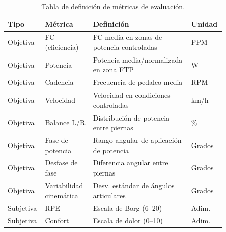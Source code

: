 \begin{table}[htbp]
      \caption{Tabla de definición de métricas de evaluación.}
      \label{tab:metricas_definicion}
      \centering
      \small
      \begin{tabular}{p{0.11\linewidth}p{0.21\linewidth}p{0.43\linewidth}p{0.10\linewidth}}
            \toprule
            \textbf{Tipo} & \textbf{Métrica}        & \textbf{Definición}                       & \textbf{Unidad} \\
            \midrule
            Objetiva      & FC (eficiencia)         & FC media en zonas de potencia controladas & PPM             \\
            Objetiva      & Potencia                & Potencia media/normalizada en zona FTP    & W               \\
            Objetiva      & Cadencia                & Frecuencia de pedaleo media               & RPM             \\
            Objetiva      & Velocidad               & Velocidad en condiciones controladas      & km/h            \\
            Objetiva      & Balance L/R             & Distribución de potencia entre piernas    & \%              \\
            Objetiva      & Fase de potencia        & Rango angular de aplicación de potencia   & Grados          \\
            Objetiva      & Desfase de fase         & Diferencia angular entre piernas          & Grados          \\
            Objetiva      & Variabilidad cinemática & Desv. estándar de ángulos articulares    & Grados          \\
            Subjetiva     & RPE                     & Escala de Borg (6--20)                    & Adim.           \\
            Subjetiva     & Confort                 & Escala de dolor (0--10)                   & Adim.           \\
            \bottomrule
      \end{tabular}
\end{table}

